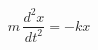 \documentclass[preview]{standalone}
\begin{document}
\begin{align*}
m\, \dfrac{d^2 x}{dt^2} = -k x
\end{align*}
\end{document}
